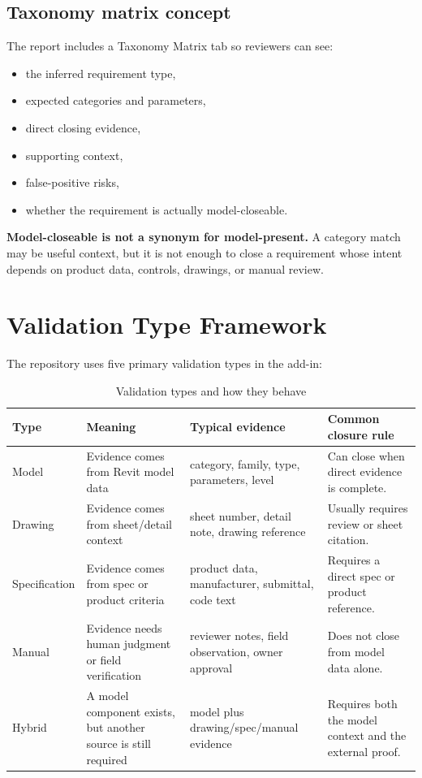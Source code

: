 \documentclass[10pt,letterpaper]{article}
\newcommand{\strong}[1]{\textbf{\textcolor{emaNavy}{#1}}}
\newcommand{\keyconcept}[1]{%
\begin{tcolorbox}[colback=emaSoft,borderline west={3pt}{0pt}{emaBlue}]
\small #1
\end{tcolorbox}}
\begin{document}
\subsection{Taxonomy matrix concept}

The report includes a Taxonomy Matrix tab so reviewers can see:

\begin{itemize}
  \item the inferred requirement type,
  \item expected categories and parameters,
  \item direct closing evidence,
  \item supporting context,
  \item false-positive risks,
  \item whether the requirement is actually model-closeable.
\end{itemize}

\keyconcept{\strong{Model-closeable is not a synonym for model-present.} A category match may be useful context, but it is not enough to close a requirement whose intent depends on product data, controls, drawings, or manual review.}

\section{Validation Type Framework}

The repository uses five primary validation types in the add-in:

\begin{longtable}{p{1.2in}p{1.7in}p{2.1in}p{1.9in}}
\caption{Validation types and how they behave}\\
\toprule
\textbf{Type} & \textbf{Meaning} & \textbf{Typical evidence} & \textbf{Common closure rule} \\
\midrule
\endhead
Model & Evidence comes from Revit model data & category, family, type, parameters, level & Can close when direct evidence is complete. \\
Drawing & Evidence comes from sheet/detail context & sheet number, detail note, drawing reference & Usually requires review or sheet citation. \\
Specification & Evidence comes from spec or product criteria & product data, manufacturer, submittal, code text & Requires a direct spec or product reference. \\
Manual & Evidence needs human judgment or field verification & reviewer notes, field observation, owner approval & Does not close from model data alone. \\
Hybrid & A model component exists, but another source is still required & model plus drawing/spec/manual evidence & Requires both the model context and the external proof. \\
\bottomrule
\end{longtable}
\end{document}

